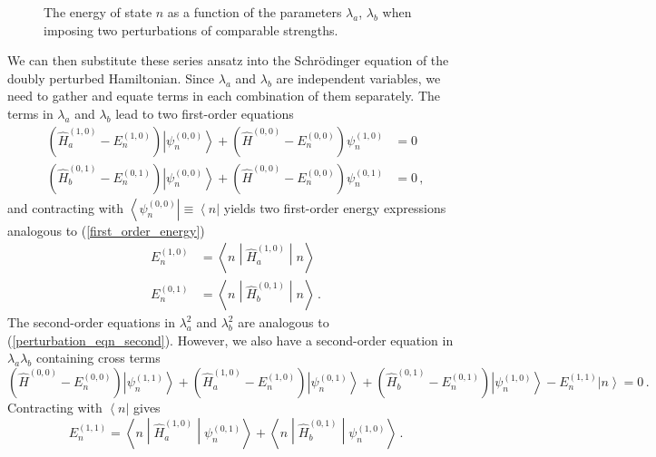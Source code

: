 \documentclass{article}
\theoremstyle{plain}\theoremheaderfont{\normalfont\itshape}\theorembodyfont{\rmfamily}\theoremseparator{.}\newtheorem*{rem}{Remark}\newtheorem*{ex}{Example}\newtheorem*{proof}{Proof}\newtheorem*{altp}{Alternative proof}
\theoremstyle{plain}\theoremheaderfont{\normalfont\bfseries}\theorembodyfont{\rmfamily}\theoremseparator{.}\newtheorem{thm}{Theorem}[section]\newtheorem{lem}[thm]{Lemma}\newtheorem{prop}[thm]{Proposition}\newtheorem*{cor}{Corollary}\newtheorem{defn}[thm]{Definition}\newtheorem{clm}[thm]{Claim}\newtheorem{clminproof}{Claim}
\theoremstyle{break}\theoremheaderfont{\normalfont\itshape}\theorembodyfont{\rmfamily}\theoremseparator{.\medskip}\newtheorem*{proofskip}{Proof}\newtheorem*{exs}{Examples}\newtheorem*{rems}{Remarks}
\theoremstyle{break}\theoremheaderfont{\normalfont\bfseries}\theorembodyfont{\rmfamily}\theoremseparator{.\medskip}\newtheorem{lemskip}[thm]{Lemma}\newtheorem{defnskip}[thm]{Definition}\newtheorem{propskip}[thm]{Proposition}\newtheorem{thmskip}[thm]{Theorem}
\numberwithin{equation}{section}
\newcommand{\bra}[1]{\left\langle #1 \right|}
\newcommand{\ket}[1]{\left| #1 \right\rangle}
\newcommand{\mel}[3]{\left\langle #1 \middle| #2 \middle| #3 \right\rangle}
\newcommand{\expval}[2]{\left\langle #2 \middle| #1 \middle| #2 \right\rangle}
\begin{document}
    \begin{figure}
        \centering
        \caption{The energy of state \(n\) as a function of the parameters \(\lambda_a\), \(\lambda_b\) when imposing two perturbations of comparable strengths.}
    \end{figure}

    We can then substitute these series ansatz into the Schr\"{o}dinger equation of the doubly perturbed Hamiltonian. Since \(\lambda_a\) and \(\lambda_b\) are independent variables, we need to gather and equate terms in each combination of them separately. The terms in \(\lambda_a\) and \(\lambda_b\) lead to two first-order equations
    \begin{align}
        (\hat{H}_a^{(1,0)}-E_n^{(1,0)})\ket{\psi_n^{(0,0)}}+(\hat{H}^{(0,0)}-E_n^{(0,0)})\psi_n^{(1,0)}&=0 \label{pertubration_a_equation}\\
        (\hat{H}_b^{(0,1)}-E_n^{(0,1)})\ket{\psi_n^{(0,0)}}+(\hat{H}^{(0,0)}-E_n^{(0,0)})\psi_n^{(0,1)}&=0\,, \label{pertubration_b_equation}
    \end{align}
    and contracting with \(\bra{\psi_n^{(0,0)}}\equiv\bra{n}\) yields two first-order energy expressions analogous to (\ref{first_order_energy})
    \begin{align}
        E_n^{(1,0)}&=\expval{\hat{H}_a^{(1,0)}}{n}\\
        E_n^{(0,1)}&=\expval{\hat{H}_b^{(0,1)}}{n}\,.
    \end{align}
    The second-order equations in \(\lambda_a^2\) and \(\lambda_b^2\) are analogous to (\ref{perturbation_eqn_second}). However, we also have a second-order equation in \(\lambda_a\lambda_b\) containing cross terms
    \begin{equation}
        (\hat{H}^{(0,0)}-E_n^{(0,0)})\ket{\psi_n^{(1,1)}}+(\hat{H}_a^{(1,0)}-E_n^{(1,0)})\ket{\psi_n^{(0,1)}}+(\hat{H}_b^{(0,1)}-E_n^{(0,1)})\ket{\psi_n^{(1,0)}}-E_n^{(1,1)}\ket{n}=0\,.
    \end{equation}
    Contracting with \(\bra{n}\) gives
    \begin{equation}
        E_n^{(1,1)}=\mel{n}{\hat{H}_a^{(1,0)}}{\psi_n^{(0,1)}}+\mel{n}{\hat{H}_b^{(0,1)}}{\psi_n^{(1,0)}}\,.
    \end{equation}
\end{document}
